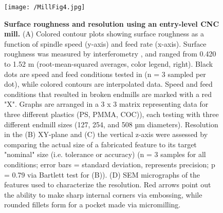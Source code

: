\begin{figure}[ht!] %
\centering
\texttt{[image: /MillFig4.jpg]}
\caption[\textbf{Surface roughness and resolution using an entry-level CNC mill.}]{\textbf{Surface roughness and resolution using an entry-level CNC mill.} (A) Colored contour plots showing surface roughness as a function of spindle speed (y-axis) and feed rate (x-axis). Surface roughness was measured by interferometry , and ranged from 0.420 to 1.52 \textmu m (root-mean-squared averages, color legend, right). Black dots are speed and feed conditions tested in (n = 3 sampled per dot), while colored contours are interpolated data. Speed and feed conditions that resulted in broken endmills are marked with a red "X". Graphs are arranged in a 3 x 3 matrix representing data for three different plastics (PS, PMMA, COC)), each testing with three different endmill sizes (127, 254, and 508 µm diameters). Resolution in the (B) XY-plane and (C) the vertical z-axis were assessed by comparing the actual size of a fabricated feature to its target "nominal" size (i.e. tolerance or accuracy) (n = 3 samples for all conditions; error bars = standard deviation, represents precision; p = 0.79 via Bartlett test for (B)). (D) SEM micrographs of the features used to characterize the resolution. Red arrows point out the ability to make sharp internal corners via embossing, while rounded fillets form for a pocket made via micromilling.}
\label{figure:MillFig4}
\end{figure}
\FloatBarrier


